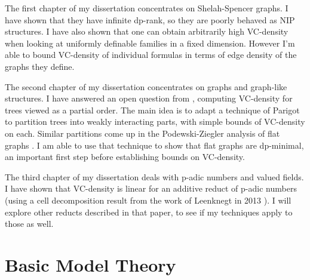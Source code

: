 The first chapter of my dissertation concentrates on Shelah-Spencer graphs. I have shown that they have infinite dp-rank, so they are poorly behaved as NIP structures. I have also shown that one can obtain arbitrarily high VC-density when looking at uniformly definable families in a fixed dimension. However I'm able to bound VC-density of individual formulas in terms of edge density of the graphs they define.

The second chapter of my dissertation concentrates on graphs and graph-like structures. I have answered an open question from \cite{density}, computing VC-density for trees viewed as a partial order. The main idea is to adapt a technique of Parigot \cite{parigot_trees} to partition trees into weakly interacting parts, with simple bounds of VC-density on each. Similar partitions come up in the Podewski-Ziegler analysis of flat graphs \cite {stable_graphs}. I am able to use that technique to show that flat graphs are dp-minimal, an important first step before establishing bounds on VC-density. 

The third chapter of my dissertation deals with p-adic numbers and valued fields. I have shown that VC-density is linear for an additive reduct of p-adic numbers (using a cell decomposition result from the work of Leenknegt in 2013 \cite{reduct}). I will explore other reducts described in that paper, to see if my techniques apply to those as well.

\section{Basic Model Theory}

